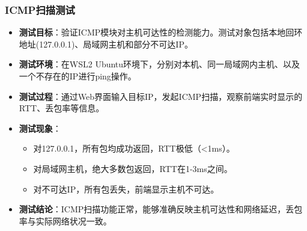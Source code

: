 \documentclass[12pt,hyperref,a4paper,UTF8]{ctexart}
\begin{document}

\subsubsection{ICMP扫描测试}
\begin{itemize}
    \item \textbf{测试目标}：验证ICMP模块对主机可达性的检测能力。测试对象包括本地回环地址(127.0.0.1)、局域网主机和部分不可达IP。
    \item \textbf{测试环境}：在WSL2 Ubuntu环境下，分别对本机、同一局域网内主机、以及一个不存在的IP进行ping操作。
    \item \textbf{测试过程}：通过Web界面输入目标IP，发起ICMP扫描，观察前端实时显示的RTT、丢包率等信息。
    \item \textbf{测试现象}：
        \begin{itemize}
            \item 对127.0.0.1，所有包均成功返回，RTT极低（<1ms）。
            \item 对局域网主机，绝大多数包返回，RTT在1-3ms之间。
            \item 对不可达IP，所有包丢失，前端显示主机不可达。
        \end{itemize}
    \item \textbf{测试结论}：ICMP扫描功能正常，能够准确反映主机可达性和网络延迟，丢包率与实际网络状况一致。
\end{itemize}
\end{document}
